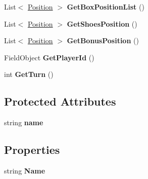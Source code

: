 \begin{DoxyCompactItemize}
\item 
List$<$ \hyperlink{classhoppin_1_1_game_system_1_1_position}{Position} $>$ {\bfseries Get\+Box\+Position\+List} ()\hypertarget{classhoppin_1_1_abstract_player_a5fee0ba7f986dee82e9755be84642180}{}\label{classhoppin_1_1_abstract_player_a5fee0ba7f986dee82e9755be84642180}

\item 
List$<$ \hyperlink{classhoppin_1_1_game_system_1_1_position}{Position} $>$ {\bfseries Get\+Shoes\+Position} ()\hypertarget{classhoppin_1_1_abstract_player_ad1d49bf27fc481633fb3e9e99e7476c2}{}\label{classhoppin_1_1_abstract_player_ad1d49bf27fc481633fb3e9e99e7476c2}

\item 
List$<$ \hyperlink{classhoppin_1_1_game_system_1_1_position}{Position} $>$ {\bfseries Get\+Bonus\+Position} ()\hypertarget{classhoppin_1_1_abstract_player_a9b923d2b46f90a291120a0bf744ec08b}{}\label{classhoppin_1_1_abstract_player_a9b923d2b46f90a291120a0bf744ec08b}

\item 
Field\+Object {\bfseries Get\+Player\+Id} ()\hypertarget{classhoppin_1_1_abstract_player_a240f787d7cf74995c9abde296758ff46}{}\label{classhoppin_1_1_abstract_player_a240f787d7cf74995c9abde296758ff46}

\item 
int {\bfseries Get\+Turn} ()\hypertarget{classhoppin_1_1_abstract_player_a1f87482ec2d48cdaabd5e5fe26c4652b}{}\label{classhoppin_1_1_abstract_player_a1f87482ec2d48cdaabd5e5fe26c4652b}

\end{DoxyCompactItemize}
\subsection*{Protected Attributes}
\begin{DoxyCompactItemize}
\item 
string {\bfseries name}\hypertarget{classhoppin_1_1_abstract_player_a35c887f2df50e45706a8ee2bdb5d07c6}{}\label{classhoppin_1_1_abstract_player_a35c887f2df50e45706a8ee2bdb5d07c6}

\end{DoxyCompactItemize}
\subsection*{Properties}
\begin{DoxyCompactItemize}
\item 
string {\bfseries Name}\hypertarget{classhoppin_1_1_abstract_player_a5bb1d301b6fe5e649bb427e1ee6aef4d}{}\label{classhoppin_1_1_abstract_player_a5bb1d301b6fe5e649bb427e1ee6aef4d}

\end{DoxyCompactItemize}


